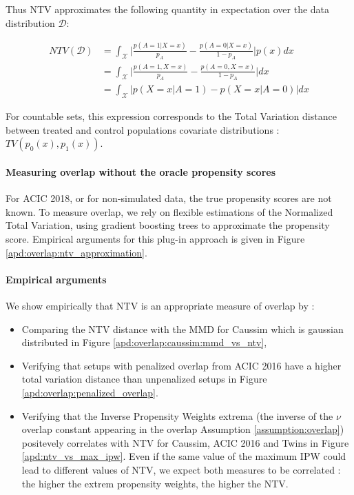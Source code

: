 \documentclass[french,12pt,twoside,a4paper]{book}
\begin{document}
\begin{appendices}
  Thus NTV approximates the following quantity in expectation over the data
  distribution $\mathcal{D}$:

  \begin{align*}
    NTV(\mathcal{D}) & = \int_{\mathcal{X}} \big | \frac{p(A=1|X=x)}{p_A}-\frac{p(A=0|X=x)}{1-{p_A}} \big | p(x)dx \\
                     & = \int_{\mathcal{X}} \big | \frac{p(A=1, X=x)}{p_A}-\frac{p(A=0, X=x)}{1-{p_A}} \big |dx    \\
                     & = \int_{\mathcal{X}} \big | p(X=x|A=1)- p(X=x|A=0) \big |dx
  \end{align*}

  For countable sets, this expression corresponds to the Total Variation distance
  between treated and control populations covariate distributions : $TV(p_0(x),
    p_1(x))$.

  \paragraph{Measuring overlap without the oracle propensity scores} For ACIC
  2018, or for non-simulated data, the true propensity scores are not known. To
  measure overlap, we rely on flexible estimations of the Normalized Total
  Variation, using gradient boosting trees to approximate the propensity score.
  Empirical arguments for this plug-in approach is given in Figure
  \ref{apd:overlap:ntv_approximation}.

  \paragraph{Empirical arguments}

  We show empirically that NTV is an appropriate measure of overlap by :
  \begin{itemize}
    \item Comparing the NTV distance with the MMD for Caussim which is gaussian
          distributed in Figure \ref{apd:overlap:caussim:mmd_vs_ntv},
    \item Verifying that setups with penalized overlap from ACIC 2016 have a
          higher total variation distance than unpenalized setups in Figure
          \ref{apd:overlap:penalized_overlap}.
    \item Verifying that the Inverse Propensity Weights extrema (the inverse of
          the $\nu$ overlap constant appearing in the overlap Assumption
          \ref{assumption:overlap}) positevely correlates with NTV for Caussim,
          ACIC 2016 and Twins in Figure \ref{apd:ntv_vs_max_ipw}. Even if the same
          value of the maximum IPW could lead to different values of NTV, we
          expect both measures to be correlated : the higher the extrem propensity
          weights, the higher the NTV.
  \end{itemize}



\end{appendices}
\end{document}
